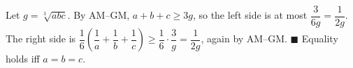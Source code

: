 Let $g=\sqrt[3]{abc}$. By AM--GM, $a+b+c\ge3g$, so the left side is at most $\dfrac3{6g}=\dfrac1{2g}$. The right side is $\dfrac16\left(\dfrac1a+\dfrac1b+\dfrac1c\right)\ge\dfrac16\cdot\dfrac3g=\dfrac1{2g}$, again by AM--GM. $\blacksquare$ Equality holds iff $a=b=c$.

